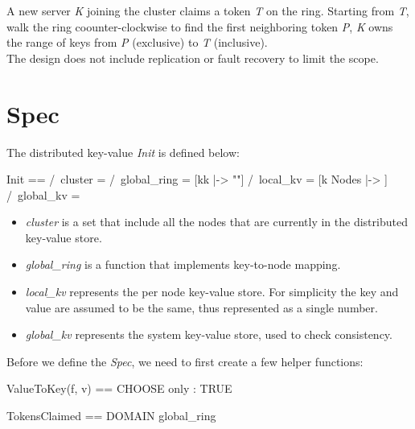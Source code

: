 A new server \textit{K} joining the cluster claims a token \textit{T} on the
ring. Starting from \textit{T}, walk the ring coounter-clockwise to find the
first neighboring token \textit{P}, \textit{K} owns the range of keys from
\textit{P} (exclusive) to \textit{T} (inclusive).\\

The design does not include replication or fault recovery to limit the scope.

\section{Spec}

The distributed key-value \textit{Init} is defined below:\\

\begin{tla}
Init ==
    /\ cluster = {}
    /\ global_ring = [kk \in {} |-> ""]
    /\ local_kv = [k \in Nodes |-> {}]
    /\ global_kv = {}
\end{tla}
\begin{tlatex}
%
%
%
\end{tlatex}

\begin{itemize}
    \item \textit{cluster} is a set that include all the nodes that are currently in the distributed key-value store.
    \item \textit{global\_ring} is a function that implements key-to-node mapping.
    \item \textit{local\_kv} represents the per node key-value store. For
    simplicity the key and value are assumed to be the same, thus represented
    as a single number.
    \item \textit{global\_kv} represents the system key-value store, used to check consistency.
\end{itemize}

Before we define the \textit{Spec}, we need to first create a few helper functions:\\
\begin{tla}
ValueToKey(f, v) == 
    CHOOSE only : TRUE

TokensClaimed == 
    DOMAIN global_ring
\end{tla}
\begin{tlatex}
%
\@pvspace{8.0pt}%
%
%
\end{tlatex}
\\


